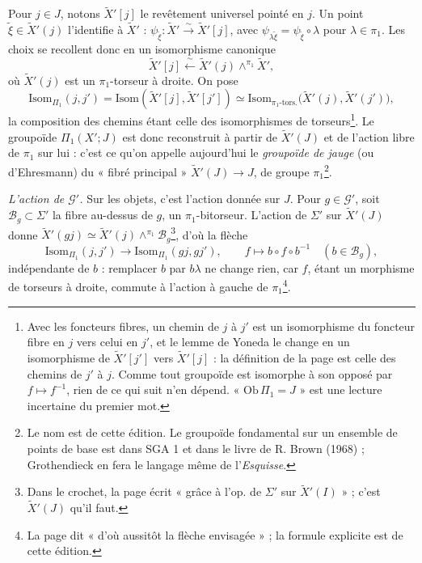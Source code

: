 \documentclass[11pt,a4paper]{article}
\begin{document}
Pour $j \in J$, notons $\widetilde X'[j]$ le revêtement universel pointé en
$j$. Un point $\tilde\xi \in \widetilde X'(j)$ l'identifie à $\widetilde X'$ :
$\psi_{\tilde\xi} : \widetilde X' \xrightarrow{\sim} \widetilde X'[j]$, avec
$\psi_{\lambda\tilde\xi} = \psi_{\tilde\xi} \circ \lambda$ pour $\lambda \in
\pi_1$. Les choix se recollent donc en un isomorphisme canonique
\[
\widetilde X'[j] \xleftarrow{\ \sim\ } \widetilde X'(j) \wedge^{\pi_1}
\widetilde X',
\]
où $\widetilde X'(j)$ est un $\pi_1$-torseur à droite. On pose
\[
\mathrm{Isom}_{\Pi_1}(j, j') = \mathrm{Isom}(\widetilde X'[j], \widetilde
X'[j']) \simeq \mathrm{Isom}_{\pi_1\text{-tors.}}\bigl(\widetilde X'(j),
\widetilde X'(j')\bigr),
\]
la composition des chemins étant celle des isomorphismes de
torseurs\footnote{Avec les foncteurs fibres, un chemin de $j$ à $j'$ est un
isomorphisme du foncteur fibre en $j$ vers celui en $j'$, et le lemme de
Yoneda le change en un isomorphisme de $\widetilde X'[j']$ vers $\widetilde
X'[j]$ : la définition de la page est celle des chemins de $j'$ à $j$. Comme
tout groupoïde est isomorphe à son opposé par $f \mapsto f^{-1}$, rien de ce qui
suit n'en dépend. « $\mathrm{Ob}\,\Pi_1 = J$ » est une lecture incertaine du
premier mot.}. Le groupoïde $\Pi_1(X'; J)$ est donc reconstruit à partir de
$\widetilde X'(J)$ et de l'action libre de $\pi_1$ sur lui : c'est ce qu'on
appelle aujourd'hui le \emph{groupoïde de jauge} (ou d'Ehresmann) du
« fibré principal » $\widetilde X'(J) \to J$, de groupe $\pi_1$\footnote{Le nom
est de cette édition. Le groupoïde fondamental sur un ensemble de points de
base est dans SGA 1 et dans le livre de R. Brown (1968) ; Grothendieck en fera
le langage même de l'\emph{Esquisse}.}.

\emph{L'action de $\mathcal{G}'$.} Sur les objets, c'est l'action donnée sur
$J$. Pour $g \in \mathcal{G}'$, soit $\mathcal{B}_g \subset \Sigma'$ la fibre
au-dessus de $g$, un $\pi_1$-bitorseur. L'action de $\Sigma'$ sur $\widetilde
X'(J)$ donne $\widetilde X'(gj) \simeq \widetilde X'(j) \wedge^{\pi_1}
\mathcal{B}_g$\footnote{Dans le crochet, la page écrit « grâce à l'op. de
$\Sigma'$ sur $\widetilde X'(I)$ » ; c'est $\widetilde X'(J)$ qu'il faut.}, d'où
la flèche
\[
\mathrm{Isom}_{\Pi_1}(j, j') \longrightarrow \mathrm{Isom}_{\Pi_1}(gj, gj'),
\qquad f \longmapsto b \circ f \circ b^{-1} \quad (b \in \mathcal{B}_g),
\]
indépendante de $b$ : remplacer $b$ par $b\lambda$ ne change rien, car $f$,
étant un morphisme de torseurs à droite, commute à l'action à gauche de
$\pi_1$\footnote{La page dit « d'où aussitôt la flèche envisagée » ; la
formule explicite est de cette édition.}.
\end{document}
